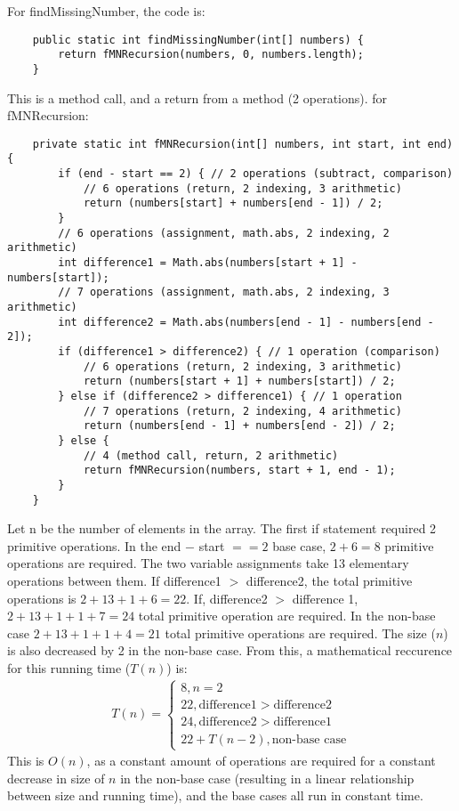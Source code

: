 \documentclass{article}
\begin{document}
	For findMissingNumber, the code is:
	\begin{lstlisting}
	public static int findMissingNumber(int[] numbers) {
		return fMNRecursion(numbers, 0, numbers.length);
	}
	\end{lstlisting}
	This is a method call, and a return from a method (2 operations). for fMNRecursion:
	\begin{lstlisting}
	private static int fMNRecursion(int[] numbers, int start, int end) {
		if (end - start == 2) { // 2 operations (subtract, comparison)
			// 6 operations (return, 2 indexing, 3 arithmetic)
			return (numbers[start] + numbers[end - 1]) / 2;
		}
		// 6 operations (assignment, math.abs, 2 indexing, 2 arithmetic) 
		int difference1 = Math.abs(numbers[start + 1] - numbers[start]);
		// 7 operations (assignment, math.abs, 2 indexing, 3 arithmetic) 
		int difference2 = Math.abs(numbers[end - 1] - numbers[end - 2]);
		if (difference1 > difference2) { // 1 operation (comparison)
			// 6 operations (return, 2 indexing, 3 arithmetic)
			return (numbers[start + 1] + numbers[start]) / 2; 
		} else if (difference2 > difference1) { // 1 operation
			// 7 operations (return, 2 indexing, 4 arithmetic)
			return (numbers[end - 1] + numbers[end - 2]) / 2;
		} else {
			// 4 (method call, return, 2 arithmetic)
			return fMNRecursion(numbers, start + 1, end - 1);
		}
	}
	\end{lstlisting}
	Let n be the number of elements in the array. The first if statement required 2 primitive operations. In the end $-$ start $== 2$ base case, $2 + 6 = 8$ primitive operations are required. The two variable assignments take 13 elementary operations between them. If difference1 $>$ difference2, the total primitive operations is $2 + 13 + 1 + 6 = 22$. If, difference2 $>$ difference 1, $2 + 13 + 1 + 1 + 7 = 24$ total primitive operation are required. In the non-base case $2 + 13 + 1 + 1 + 4 = 21$ total primitive operations are required. The size ($n$) is also decreased by 2 in the non-base case. From this, a mathematical reccurence for this running time ($T(n)$) is:
	\begin{align*}
		T(n) = \begin{cases} 8, n = 2 \\
		22, \text{difference1} > \text{difference2} \\
		24, \text{difference2} > \text{difference1} \\
		22 + T(n - 2), \text{non-base case}  \end{cases}
	\end{align*}
	This is $O(n)$, as a constant amount of operations are required for a constant decrease in size of $n$ in the non-base case (resulting in a linear relationship between size and running time), and the base cases all run in constant time. 
\end{document}
